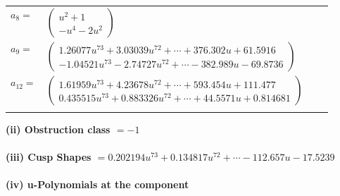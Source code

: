 \documentclass[1p]{elsarticle_modified}
\theoremstyle{definition}
\begin{document}
\begin{tabular}{m{7pt} m{180pt} m{7pt} m{180pt} }
\flushright $a_{8}=$&$\begin{pmatrix}u^2+1\\- u^4-2 u^2\end{pmatrix}$ \\
\flushright $a_{9}=$&$\begin{pmatrix}1.26077 u^{73}+3.03039 u^{72}+\cdots+376.302 u+61.5916\\-1.04521 u^{73}-2.74727 u^{72}+\cdots-382.989 u-69.8736\end{pmatrix}$ \\
\flushright $a_{12}=$&$\begin{pmatrix}1.61959 u^{73}+4.23678 u^{72}+\cdots+593.454 u+111.477\\0.435515 u^{73}+0.883326 u^{72}+\cdots+44.5571 u+0.814681\end{pmatrix}$\\&\end{tabular}
\flushleft \textbf{(ii) Obstruction class $= -1$}\\~\\
\flushleft \textbf{(iii) Cusp Shapes $= 0.202194 u^{73}+0.134817 u^{72}+\cdots-112.657 u-17.5239$}\\~\\
\newpage\renewcommand{\arraystretch}{1}
\flushleft \textbf{(iv) u-Polynomials at the component}\newline \\
\end{document}
